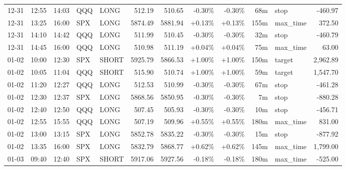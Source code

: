 \documentclass[11pt,a4paper,twoside]{article}
\begin{document}
\begin{center}
\begin{longtable}{>{\color{txtmain}}l l l l l r r r r r >{\color{txtmain}}l r}
12-31 & 12:55 & 14:03 & QQQ & LONG & 512.19 & 510.65 & \textcolor{lossred}{-0.30\%} & \textcolor{lossred}{-0.30\%} & 68m & stop & \textcolor{lossred}{-460.97} \\
12-31 & 13:25 & 16:00 & SPX & LONG & 5874.49 & 5881.94 & \textcolor{wingreen}{+0.13\%} & \textcolor{wingreen}{+0.13\%} & 155m & max\_time & \textcolor{wingreen}{372.50} \\
12-31 & 14:10 & 14:42 & QQQ & LONG & 511.99 & 510.45 & \textcolor{lossred}{-0.30\%} & \textcolor{lossred}{-0.30\%} & 32m & stop & \textcolor{lossred}{-460.79} \\
12-31 & 14:45 & 16:00 & QQQ & LONG & 510.98 & 511.19 & \textcolor{wingreen}{+0.04\%} & \textcolor{wingreen}{+0.04\%} & 75m & max\_time & \textcolor{wingreen}{63.00} \\
01-02 & 10:00 & 12:30 & SPX & SHORT & 5925.79 & 5866.53 & \textcolor{wingreen}{+1.00\%} & \textcolor{wingreen}{+1.00\%} & 150m & target & \textcolor{wingreen}{2,962.89} \\
01-02 & 10:05 & 11:04 & QQQ & SHORT & 515.90 & 510.74 & \textcolor{wingreen}{+1.00\%} & \textcolor{wingreen}{+1.00\%} & 59m & target & \textcolor{wingreen}{1,547.70} \\
01-02 & 11:20 & 12:27 & QQQ & LONG & 512.53 & 510.99 & \textcolor{lossred}{-0.30\%} & \textcolor{lossred}{-0.30\%} & 67m & stop & \textcolor{lossred}{-461.28} \\
01-02 & 12:30 & 12:37 & SPX & LONG & 5868.56 & 5850.95 & \textcolor{lossred}{-0.30\%} & \textcolor{lossred}{-0.30\%} & 7m & stop & \textcolor{lossred}{-880.28} \\
01-02 & 12:40 & 12:50 & QQQ & LONG & 507.45 & 505.93 & \textcolor{lossred}{-0.30\%} & \textcolor{lossred}{-0.30\%} & 10m & stop & \textcolor{lossred}{-456.71} \\
01-02 & 12:55 & 15:55 & QQQ & LONG & 507.19 & 509.96 & \textcolor{wingreen}{+0.55\%} & \textcolor{wingreen}{+0.55\%} & 180m & max\_time & \textcolor{wingreen}{831.00} \\
01-02 & 13:00 & 13:15 & SPX & LONG & 5852.78 & 5835.22 & \textcolor{lossred}{-0.30\%} & \textcolor{lossred}{-0.30\%} & 15m & stop & \textcolor{lossred}{-877.92} \\
01-02 & 13:35 & 16:00 & SPX & LONG & 5832.79 & 5868.77 & \textcolor{wingreen}{+0.62\%} & \textcolor{wingreen}{+0.62\%} & 145m & max\_time & \textcolor{wingreen}{1,799.00} \\
01-03 & 09:40 & 12:40 & SPX & SHORT & 5917.06 & 5927.56 & \textcolor{lossred}{-0.18\%} & \textcolor{lossred}{-0.18\%} & 180m & max\_time & \textcolor{lossred}{-525.00} \\

\end{longtable}
\end{center}
\end{document}
